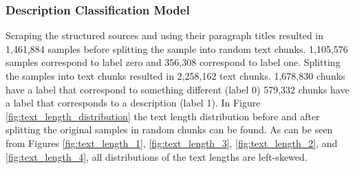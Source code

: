 \documentclass[a4paper, 12pt, oneside]{book} %
\begin{document}
\subsubsection{Description Classification Model}
Scraping the structured sources and using their paragraph titles resulted in 1,461,884 samples before splitting the sample into random text chunks.
1,105,576 samples correspond to label zero and 356,308 correspond to label one.
Splitting the samples into text chunks resulted in 2,258,162 text chunks.
1,678,830 chunks have a label that correspond to something different (label 0) 579,332 chunks have a label that corresponds to a description (label 1).
In Figure \ref{fig:text_length_distribution} the text length distribution before and after splitting the original samples in random chunks can be found.
As can be seen from Figures \ref{fig:text_length_1}, \ref{fig:text_length_3}, \ref{fig:text_length_2}, and \ref{fig:text_length_4}, all distributions of the text lengths are left-skewed. 
\end{document}
